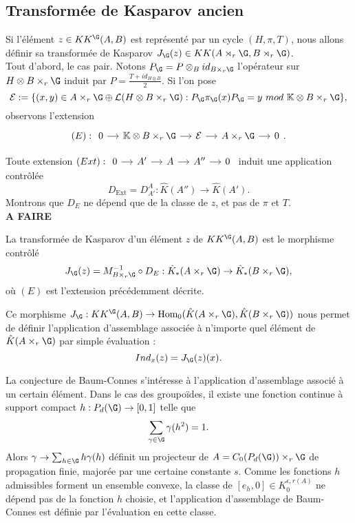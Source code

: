 \subsection{Transformée de Kasparov ancien}
Si l'élément $z\in KK^\G(A,B)$ est représenté par un cycle $(H,\pi,T)$, nous allons définir sa transformée de Kasparov $J_\G(z)\in KK(A\rtimes_r \G, B\rtimes_r\G)$. \\

Tout d'abord, le cas pair. Notons $P_\G=P\otimes_B id_{B\times_r \G}$ l'opérateur sur $H\otimes B\times_r \G$ induit par $P=\frac{T+id_{H\otimes B}}{2}$. Si l'on pose 
\[\mathcal E :=\{(x,y)\in A\times_r \G \oplus \mathcal L (H\otimes B\times_r \G) : P_\G \pi_\G(x) P_\G = y \ mod \ \K\otimes B\times_r \G\}, \]
observons l'extension
\[(E): \begin{tikzcd}[column sep = small]
0\arrow{r} & \K \otimes B\times_r \G \arrow{r} & \mathcal E \arrow{r} & A\times_r \G \arrow{r} & 0
\end{tikzcd}.\] 

Toute extension $(Ext):\begin{tikzcd}[column sep = small]0\arrow{r}& A' \arrow{r} & A \arrow{r} & A'' \arrow{r} & 0\end{tikzcd}$ induit une application contrôlée 
\[D_{\text{Ext}}=D_{A'}^A : \hat K(A'') \rightarrow \hat K(A'). \]
Montrons que $D_{E}$ ne dépend que de la classe de $z$, et pas de $\pi$ et $T$.\\
\textbf{A FAIRE}\\

\begin{definition}
La transformée de Kasparov d'un élément $z$ de $KK^\G(A,B)$ est le morphisme contrôlé 
\[J_\G (z) = M_{B\times_r \G}^{-1} \circ D_E : \hat K_*(A\times_r \G)\rightarrow \hat K_* (B\times_r \G),\]
où $(E)$ est l'extension précédemment décrite.
\end{definition}

Ce morphisme $J_\G : KK^\G(A,B)\rightarrow \text{Hom}_0(\hat K(A\times_r \G),\hat K(B\times_r \G))$ nous permet de définir l'application d'assemblage associée à n'importe quel élément de $\hat K(A\times_r \G)$ par simple évaluation :
\[Ind_x (z)= J_\G ( z ) (x).\]

La conjecture de Baum-Connes s'intéresse à l'application d'assemblage associé à un certain élément. Dans le cas des groupoïdes, il existe une fonction continue à support compact $h :P_d(\G) \rightarrow [0,1]$ telle que 
\[\sum_{\gamma\in \G} \gamma (h^2)=1.\]
Alors $ \gamma \rightarrow \sum_{h\in \G} h \gamma(h)$ définit un projecteur de $A=C_0(P_d(\G))\times_r \G$ de propagation finie, majorée par une certaine constante $s$. Comme les fonctions $h$ admissibles forment un ensemble convexe, la classe de $[e_h, 0]\in K_0^{\epsilon,r (A)}$ ne dépend pas de la fonction $h$ choisie, et l'application d'assemblage de Baum-Connes est définie par l'évaluation en cette classe.

